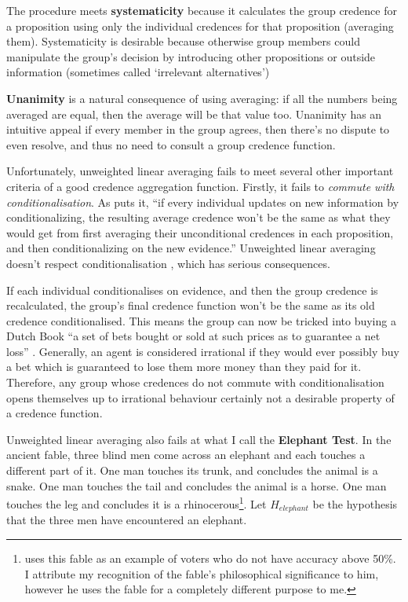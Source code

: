 \documentclass{article}
\begin{document}
The procedure meets \textbf{systematicity} because it calculates the group credence for a proposition using only the individual credences for that proposition (averaging them). Systematicity is desirable because otherwise group members could manipulate the group's decision by introducing other propositions or outside information (sometimes called `irrelevant alternatives')

\textbf{Unanimity} is a natural consequence of using averaging: if all the numbers being averaged are equal, then the average will be that value too. Unanimity has an intuitive appeal \textemdash{} if every member in the group agrees, then there's no dispute to even resolve, and thus no need to consult a group credence function. 

Unfortunately, unweighted linear averaging fails to meet several other important criteria of a good credence aggregation function. Firstly, it fails to \textit{commute with conditionalisation}. As \citet[pg. 1290]{russell2015groupthink} puts it, ``if every individual updates on new information by conditionalizing, the resulting average credence won't be the same as what they would get from first averaging their unconditional credences in each proposition, and then conditionalizing on the new evidence.'' Unweighted linear averaging doesn't respect conditionalisation \citep[pg. 87]{loewer1985destroying}, which has serious consequences.

If each individual conditionalises on evidence, and then the group credence is recalculated, the group's final credence function won't be the same as its old credence conditionalised. This means the group can now be tricked into buying a Dutch Book \textemdash{} ``a set of bets bought or sold at such prices as to guarantee a net loss'' \citep{hajek2008dutch}. Generally, an agent is considered irrational if they would ever possibly buy a bet which is guaranteed to lose them more money than they paid for it. Therefore, any group whose credences do not commute with conditionalisation opens themselves up to irrational behaviour \textemdash{} certainly not a desirable property of a credence function.

Unweighted linear averaging also fails at what I call the \textbf{Elephant Test}. In the ancient fable, three blind men come across an elephant and each touches a different part of it. One man touches its trunk, and concludes the animal is a snake. One man touches the tail and concludes the animal is a horse. One man touches the leg and concludes it is a rhinocerous\footnote{\citet[pg. 229]{estlund2009democratic} uses this fable as an example of voters who do not have accuracy above 50\%. I attribute my recognition of the fable's philosophical significance to him, however he uses the fable for a completely different purpose to me.}. Let \(H_{elephant}\) be the hypothesis that the three men have encountered an elephant. 
\end{document}
